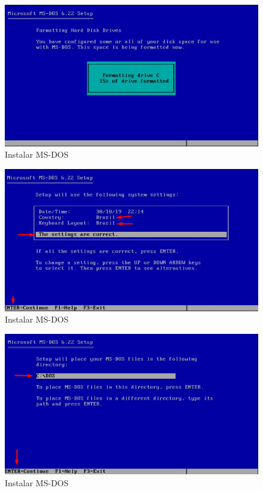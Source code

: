 \documentclass{report}
\begin{document}
\begin{figure}
\centering
\includegraphics[width=\textwidth]{Screenshot_16.png}
\caption{Instalar MS-DOS}
\label{fig:16}
\end{figure}

\begin{figure}
\centering
\includegraphics[width=\textwidth]{Screenshot_17.png}
\caption{Instalar MS-DOS}
\label{fig:17}
\end{figure}

\begin{figure}
\centering
\includegraphics[width=\textwidth]{Screenshot_18.png}
\caption{Instalar MS-DOS}
\label{fig:18}
\end{figure}
\end{document}
